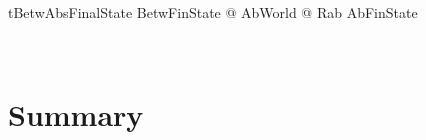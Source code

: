 \begin{LThm}%
\begin{theorem}{tBetwAbsFinalState}
    \forall BetwFinState @ \exists AbWorld @ Rab \land AbFinState
\end{theorem}~\end{LThm}

\newpage
\section{Summary}\label{ch12.summary}

\ldefsummary %
\lthmsummary %
\lthmaddeddefsummary %
\lthmaddedthmsummary %
\lzevessummary %
